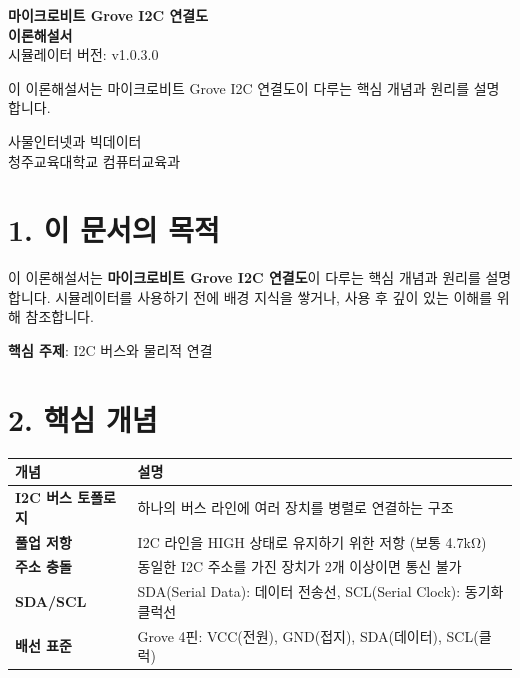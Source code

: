 \documentclass[11pt,a4paper]{article}
\begin{document}
\begin{titlepage}
\centering
\vspace*{3cm}
{\Huge\bfseries\color{primary} 마이크로비트 Grove I2C 연결도}\\[0.5cm]
{\Huge\bfseries\color{primary} 이론해설서}
\\[1.5cm]
{\Large 시뮬레이터 버전: v1.0.3.0}
\\[2cm]
\begin{tcolorbox}[summarybox]
\centering
{\large 이 이론해설서는 마이크로비트 Grove I2C 연결도이 다루는 핵심 개념과 원리를 설명합니다.}
\end{tcolorbox}
\vfill
{\large 사물인터넷과 빅데이터}\\[0.3cm]
{\large 청주교육대학교 컴퓨터교육과}
\vspace{1cm}
\end{titlepage}

\section*{1. 이 문서의 목적}

이 이론해설서는 \textbf{마이크로비트 Grove I2C 연결도}이 다루는 핵심 개념과 원리를 설명합니다. 시뮬레이터를 사용하기 전에 배경 지식을 쌓거나, 사용 후 깊이 있는 이해를 위해 참조합니다.


\begin{tcolorbox}[summarybox]
\textbf{핵심 주제}: I2C 버스와 물리적 연결

\end{tcolorbox}


\section*{2. 핵심 개념}

\begin{center}
\renewcommand{\arraystretch}{1.4}
\begin{tabular}{|p{3.7cm}|p{11.3cm}|}
\hline
\rowcolor{tableheader}
\textbf{개념} & \textbf{설명} \\
\hline
\textbf{I2C 버스 토폴로지} & 하나의 버스 라인에 여러 장치를 병렬로 연결하는 구조 \\
\hline
\textbf{풀업 저항} & I2C 라인을 HIGH 상태로 유지하기 위한 저항 (보통 4.7kΩ) \\
\hline
\textbf{주소 충돌} & 동일한 I2C 주소를 가진 장치가 2개 이상이면 통신 불가 \\
\hline
\textbf{SDA/SCL} & SDA(Serial Data): 데이터 전송선, SCL(Serial Clock): 동기화 클럭선 \\
\hline
\textbf{배선 표준} & Grove 4핀: VCC(전원), GND(접지), SDA(데이터), SCL(클럭) \\
\hline
\end{tabular}
\end{center}
\end{document}
